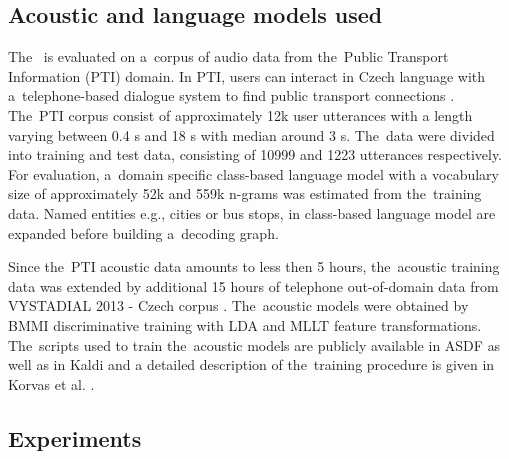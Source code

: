 \subsection{Acoustic and language models used}
\label{sec:train}

The~ is evaluated on a~corpus of audio data from the~Public Transport Information (PTI) domain.
In PTI, users can interact in Czech language with a~telephone-based dialogue system to find public transport connections \cite{ptics2014url}.
The~PTI corpus consist of approximately 12k user utterances with a length varying between 0.4 s and 18 s with median around 3 s.
The~data were divided into training and test data, consisting of 10999 and 1223 utterances respectively.
For evaluation, a~domain specific class-based language model with a vocabulary size of approximately 52k  and 559k n-grams was estimated from the~training data.
Named entities e.g., cities or bus stops, in class-based language model are expanded before building a~decoding graph.

Since the~PTI acoustic data amounts to less then 5 hours, the~acoustic training data was extended by additional 15 hours of telephone out-of-domain data from VYSTADIAL 2013 - Czech corpus \cite{korvas_2014}.
The~acoustic models were obtained by BMMI discriminative training with LDA and MLLT feature transformations.
The~scripts used to train the~acoustic models are publicly available in ASDF \cite{asdf2014url} as well as in Kaldi \cite{kaldi2014url} and a detailed description of the~training procedure is given in Korvas et al. \cite{korvas_2014}.


\subsection{Experiments}


